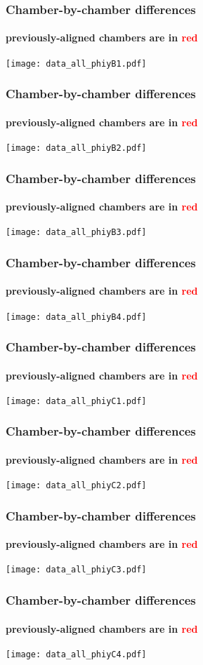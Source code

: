 \documentclass[compress]{beamer}
\begin{document}
\begin{frame}
\frametitle{Chamber-by-chamber differences}
\framesubtitle{previously-aligned chambers are in \textcolor{red}{red}}
\texttt{[image: data\_all\_phiyB1.pdf]}
\end{frame}

\begin{frame}
\frametitle{Chamber-by-chamber differences}
\framesubtitle{previously-aligned chambers are in \textcolor{red}{red}}
\texttt{[image: data\_all\_phiyB2.pdf]}
\end{frame}

\begin{frame}
\frametitle{Chamber-by-chamber differences}
\framesubtitle{previously-aligned chambers are in \textcolor{red}{red}}
\texttt{[image: data\_all\_phiyB3.pdf]}
\end{frame}

\begin{frame}
\frametitle{Chamber-by-chamber differences}
\framesubtitle{previously-aligned chambers are in \textcolor{red}{red}}
\texttt{[image: data\_all\_phiyB4.pdf]}
\end{frame}

\begin{frame}
\frametitle{Chamber-by-chamber differences}
\framesubtitle{previously-aligned chambers are in \textcolor{red}{red}}
\texttt{[image: data\_all\_phiyC1.pdf]}
\end{frame}

\begin{frame}
\frametitle{Chamber-by-chamber differences}
\framesubtitle{previously-aligned chambers are in \textcolor{red}{red}}
\texttt{[image: data\_all\_phiyC2.pdf]}
\end{frame}

\begin{frame}
\frametitle{Chamber-by-chamber differences}
\framesubtitle{previously-aligned chambers are in \textcolor{red}{red}}
\texttt{[image: data\_all\_phiyC3.pdf]}
\end{frame}

\begin{frame}
\frametitle{Chamber-by-chamber differences}
\framesubtitle{previously-aligned chambers are in \textcolor{red}{red}}
\texttt{[image: data\_all\_phiyC4.pdf]}
\end{frame}
\end{document}
